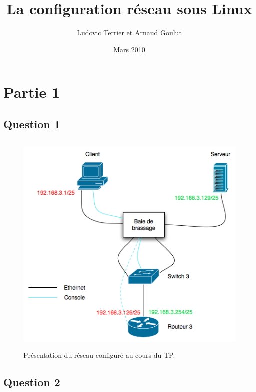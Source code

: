 \documentclass[12pt,a4paper,notitlepage]{article}
\begin{document}
\title{La configuration réseau sous Linux}
\author{Ludovic Terrier et Arnaud Goulut}
\date{Mars 2010}
\maketitle



\thispagestyle{empty}
\newpage



\section{Partie 1}

\subsection{Question 1}
\begin{figure}[!h]
\begin{center}
\includegraphics[height=11cm]{Diag.png}
\caption{Présentation du réseau configuré au cours du TP.}
\label{fig:do}
\end{center}
\end{figure}
\subsection{Question 2}
\end{document}
